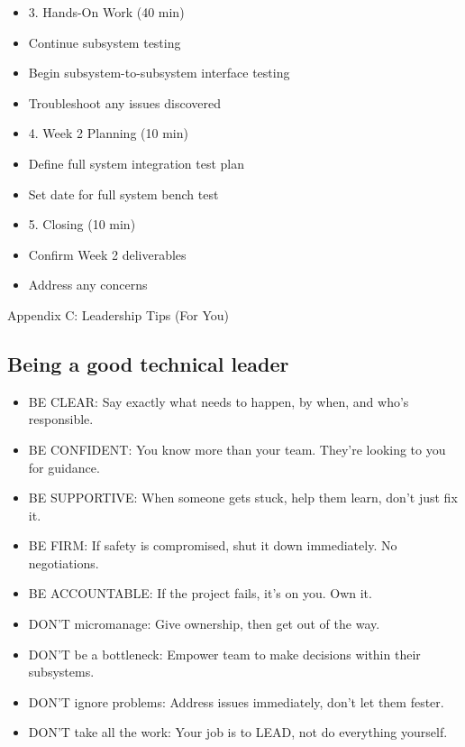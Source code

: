 \documentclass[11pt,letterpaper]{article}
\begin{document}
{\begin{itemize}
  \item 3. Hands-On Work (40 min)
  \item Continue subsystem testing
  \item Begin subsystem-to-subsystem interface testing
  \item Troubleshoot any issues discovered
\end{itemize}

\begin{itemize}
  \item 4. Week 2 Planning (10 min)
  \item Define full system integration test plan
  \item Set date for full system bench test
\end{itemize}

\begin{itemize}
  \item 5. Closing (10 min)
  \item Confirm Week 2 deliverables
  \item Address any concerns
\end{itemize}

Appendix C: Leadership Tips (For You)\par

\subsection{Being a good technical leader}

\begin{itemize}
  \item BE CLEAR: Say exactly what needs to happen, by when, and who's responsible.
  \item BE CONFIDENT: You know more than your team. They're looking to you for guidance.
  \item BE SUPPORTIVE: When someone gets stuck, help them learn, don't just fix it.
  \item BE FIRM: If safety is compromised, shut it down immediately. No negotiations.
  \item BE ACCOUNTABLE: If the project fails, it's on you. Own it.
\end{itemize}

\begin{itemize}
  \item DON'T micromanage: Give ownership, then get out of the way.
  \item DON'T be a bottleneck: Empower team to make decisions within their subsystems.
  \item DON'T ignore problems: Address issues immediately, don't let them fester.
  \item DON'T take all the work: Your job is to LEAD, not do everything yourself.
\end{itemize}

}
\end{document}
